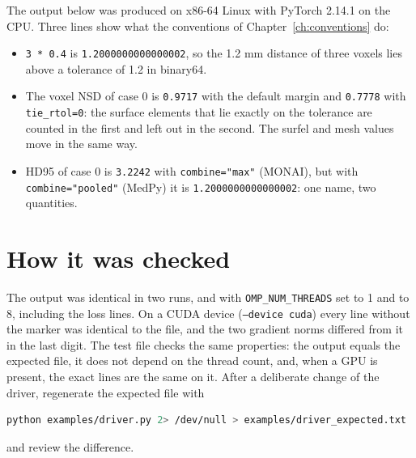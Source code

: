 The output below was produced on x86-64 Linux with PyTorch 2.14.1 on the CPU.
Three lines show what the conventions of Chapter~\ref{ch:conventions} do:
\begin{itemize}[nosep]
\item \texttt{3 * 0.4} is \texttt{1.2000000000000002}, so the 1.2 mm distance of three voxels
  lies above a tolerance of 1.2 in binary64.
\item The voxel NSD of case 0 is \texttt{0.9717} with the default margin and \texttt{0.7778} with
  \texttt{tie\_rtol=0}: the surface elements that lie exactly on the tolerance are counted in
  the first and left out in the second. The surfel and mesh values move in the same way.
\item HD95 of case 0 is \texttt{3.2242} with \texttt{combine="max"} (MONAI), but with
  \texttt{combine="pooled"} (MedPy) it is \texttt{1.2000000000000002}: one name, two quantities.
\end{itemize}



\section{How it was checked}\label{driver:checked}

The output was identical in two runs, and with \texttt{OMP\_NUM\_THREADS} set to 1 and to 8,
including the loss lines. On a CUDA device (\texttt{--device cuda}) every line without the
marker was identical to the file, and the two gradient norms differed from it in the last
digit. The test file checks the same properties: the output equals the expected file, it does
not depend on the thread count, and, when a GPU is present, the exact lines are the same on it.
After a deliberate change of the driver, regenerate the expected file with
\begin{lstlisting}[language=bash]
python examples/driver.py 2> /dev/null > examples/driver_expected.txt
\end{lstlisting}
and review the difference.
